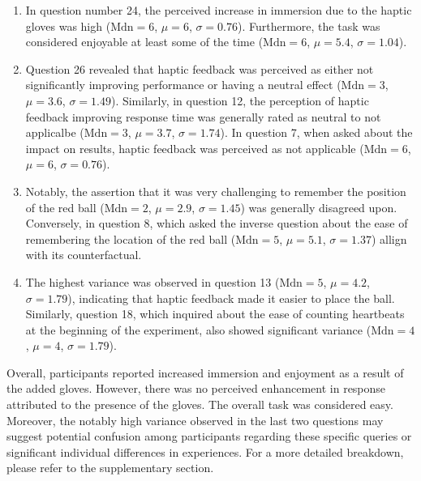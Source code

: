 \documentclass[12pt,oneside,openright]{report}
\begin{document}
\begin{enumerate}
    \item In question number 24, the perceived increase in immersion due to the haptic gloves was high ($\text{Mdn} = 6$, $\mu = 6$, $\sigma = 0.76$). Furthermore, the task was considered enjoyable at least some of the time ($\text{Mdn} = 6$, $\mu = 5.4$, $\sigma = 1.04$).
        
    \item Question 26 revealed that haptic feedback was perceived as either not significantly improving performance or having a neutral effect ($\text{Mdn} = 3$, $\mu = 3.6$, $\sigma = 1.49$). Similarly, in question 12, the perception of haptic feedback improving response time was generally rated as neutral to not applicalbe ($\text{Mdn} = 3$, $\mu = 3.7$, $\sigma = 1.74$). In question 7, when asked about the impact on results, haptic feedback was perceived as not applicable ($\text{Mdn} = 6$, $\mu = 6$, $\sigma = 0.76$).
    
    \item Notably, the assertion that it was very challenging to remember the position of the red ball ($\text{Mdn} = 2$, $\mu = 2.9$, $\sigma = 1.45$) was generally disagreed upon. Conversely, in question 8, which asked the inverse question about the ease of remembering the location of the red ball ($\text{Mdn} = 5$, $\mu = 5.1$, $\sigma = 1.37$) allign with its counterfactual. 
    
    \item The highest variance was observed in question 13 ($\text{Mdn} = 5$, $\mu = 4.2$, $\sigma = 1.79$), indicating that haptic feedback made it easier to place the ball. Similarly, question 18, which inquired about the ease of counting heartbeats at the beginning of the experiment, also showed significant variance ($\text{Mdn} = 4$, $\mu = 4$, $\sigma = 1.79$). 
        
\end{enumerate}
    
Overall, participants reported increased immersion and enjoyment as a result of the added gloves. However, there was no perceived enhancement in response attributed to the presence of the gloves. The overall task was considered easy. Moreover, the notably high variance observed in the last two questions may suggest potential confusion among participants regarding these specific queries or significant individual differences in experiences. For a more detailed breakdown, please refer to the supplementary section.
    
\end{document}
